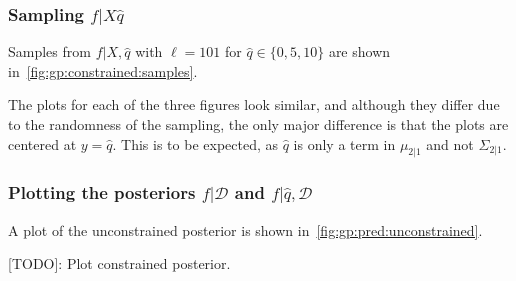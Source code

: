 \subsubsection{Sampling $f | X \hat{q}$}

Samples from $f | X, \hat{q}$ with $\ell = 101$
for $\hat{q} \in \{ 0, 5, 10 \}$ are shown in~\cref{fig:gp:constrained:samples}.

The plots for each of the three figures look similar,
and although they differ due to the randomness of the sampling,
the only major difference is that the plots are centered at
$y = \hat{q}$.
This is to be expected, as $\hat{q}$ is only a term
in $\mu_{2|1}$ and not $\Sigma_{2|1}$.

\subsubsection{
  Plotting the posteriors
  $f | \mathcal{D}$ and
  $f | \hat{q}, \mathcal{D}$
}

A plot of the unconstrained posterior is shown in~\cref{fig:gp:pred:unconstrained}.

[TODO]: Plot constrained posterior.
